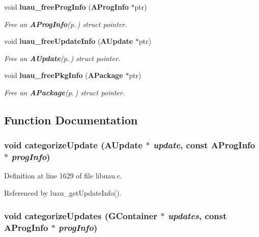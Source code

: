 \begin{CompactItemize}
void {\bf luau\_\-free\-Prog\-Info} ({\bf AProg\-Info} $\ast$ptr)
\begin{CompactList}\small\item\em Free an {\bf AProg\-Info}{\rm (p.\,\pageref{structAProgInfo})} struct pointer. \item\end{CompactList}\item 
void {\bf luau\_\-free\-Update\-Info} ({\bf AUpdate} $\ast$ptr)
\begin{CompactList}\small\item\em Free an {\bf AUpdate}{\rm (p.\,\pageref{structAUpdate})} struct pointer. \item\end{CompactList}\item 
void {\bf luau\_\-free\-Pkg\-Info} ({\bf APackage} $\ast$ptr)
\begin{CompactList}\small\item\em Free an {\bf APackage}{\rm (p.\,\pageref{structAPackage})} struct pointer. \item\end{CompactList}\end{CompactItemize}


\subsection{Function Documentation}
\subsubsection{\setlength{\rightskip}{0pt plus 5cm}void categorize\-Update ({\bf AUpdate} $\ast$ {\em update}, const {\bf AProg\-Info} $\ast$ {\em prog\-Info})\hspace{0.3cm}{\tt  [static]}}\label{libuau_8c_a2}




Definition at line 1629 of file libuau.c.

Referenced by luau\_\-get\-Update\-Info().
\subsubsection{\setlength{\rightskip}{0pt plus 5cm}void categorize\-Updates ({\bf GContainer} $\ast$ {\em updates}, const {\bf AProg\-Info} $\ast$ {\em prog\-Info})\hspace{0.3cm}{\tt  [static]}}\label{libuau_8c_a1}


